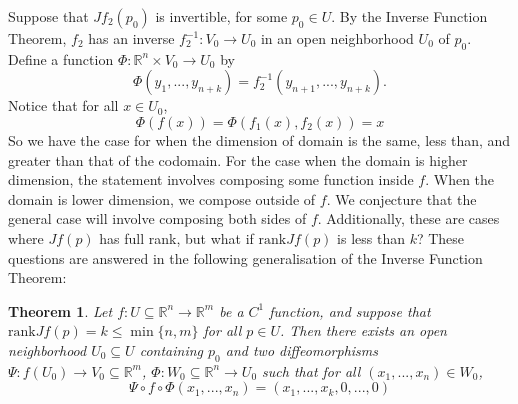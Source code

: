 \documentclass{article}
\newcommand{\rank}{\mathrm{rank}}
\theoremstyle{plain} %
\newtheorem{thm}{Theorem}
\numberwithin{thm}{section} %
\theoremstyle{definition}
\begin{document}
    Suppose that \(Jf_2(p_0)\) is invertible, for some \(p_0 \in U\). By the Inverse Function Theorem, \(f_2\) has an inverse \(f_2^{-1}: V_0 \to U_0\) in an open neighborhood \(U_0\) of \(p_0\). Define a function \(\Phi : \mathbb{R}^n \times V_0 \to U_0\) by
    \[
        \Phi (y_1, ..., y_{n+k}) = f_2^{-1}(y_{n+1} , ..., y_{n+k}).
    \]
    Notice that for all \(x \in U_0\),
    \[
        \Phi (f(x)) = \Phi (f_1(x), f_2(x)) = x
    \]
    So we have the case for when the dimension of domain is the same, less than, and greater than that of the codomain. For the case when the domain is higher dimension, the statement involves composing some function inside \(f\). When the domain is lower dimension, we compose outside of \(f\). We conjecture that the general case will involve composing both sides of \(f\).
    Additionally, these are cases where \(Jf(p)\) has full rank, but what if \(\rank Jf(p)\) is less than \(k\)? These questions are answered in the following generalisation of the Inverse Function Theorem:
    \begin{thm}
        Let \(f: U \subseteq \mathbb{R}^n \to \mathbb{R}^m\) be a \(C^1\) function, and suppose that \(\rank Jf(p) = k \leq \min \{ n,m \}\) for all \(p \in U\). Then there exists an open neighborhood \(U_0 \subseteq U\) containing \(p_0\) and two diffeomorphisms \(\Psi: f(U_0) \to V_0 \subseteq \mathbb{R}^m\), \(\Phi : W_0 \subseteq \mathbb{R}^n \to U_0\) such that for all \((x_1, ..., x_n) \in W_0\),
        \[
            \Psi \circ f \circ \Phi (x_1, ..., x_n) = (x_1, ..., x_k, 0, ..., 0)
        \]
    \end{thm}
\end{document}
